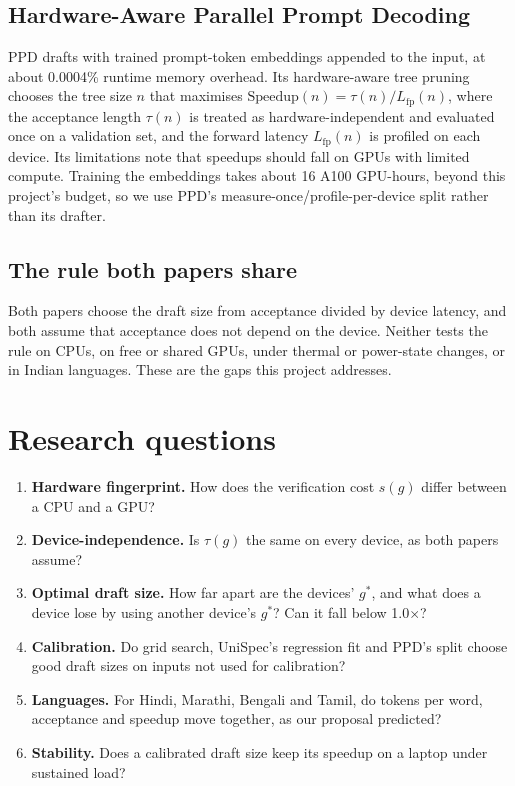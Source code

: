 \documentclass[11pt,a4paper]{article}
\begin{document}
\subsection{Hardware-Aware Parallel Prompt Decoding}
PPD \cite{ppd} drafts with trained prompt-token embeddings appended to the input, at about 0.0004\% runtime memory overhead. Its hardware-aware tree pruning chooses the tree size $n$ that maximises $\mathrm{Speedup}(n) = \tau(n)/L_{\mathrm{fp}}(n)$, where the acceptance length $\tau(n)$ is treated as hardware-independent and evaluated once on a validation set, and the forward latency $L_{\mathrm{fp}}(n)$ is profiled on each device. Its limitations note that speedups should fall on GPUs with limited compute. Training the embeddings takes about 16 A100 GPU-hours, beyond this project's budget, so we use PPD's measure-once/profile-per-device split rather than its drafter.

\subsection{The rule both papers share}
Both papers choose the draft size from acceptance divided by device latency, and both assume that acceptance does not depend on the device. Neither tests the rule on CPUs, on free or shared GPUs, under thermal or power-state changes, or in Indian languages. These are the gaps this project addresses.

\section{Research questions}
\begin{enumerate}
  \item \textbf{Hardware fingerprint.} How does the verification cost $s(g)$ differ between a CPU and a GPU?
  \item \textbf{Device-independence.} Is $\tau(g)$ the same on every device, as both papers assume?
  \item \textbf{Optimal draft size.} How far apart are the devices' $g^*$, and what does a device lose by using another device's $g^*$? Can it fall below 1.0$\times$?
  \item \textbf{Calibration.} Do grid search, UniSpec's regression fit and PPD's split choose good draft sizes on inputs not used for calibration?
  \item \textbf{Languages.} For Hindi, Marathi, Bengali and Tamil, do tokens per word, acceptance and speedup move together, as our proposal predicted?
  \item \textbf{Stability.} Does a calibrated draft size keep its speedup on a laptop under sustained load?
\end{enumerate}
\end{document}

